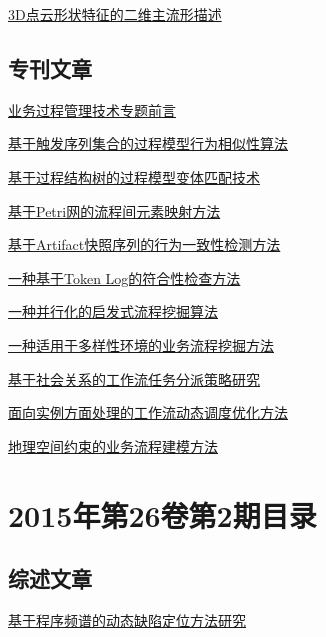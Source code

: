 \documentclass[a4paper]{article}
\begin{document}
\href{http://www.jos.org.cn/ch/reader/download_pdf.aspx?file_no=4653&year_id=2015&quarter_id=3&falg=1}{3D点云形状特征的二维主流形描述}

\subsection{专刊文章}
\href{http://www.jos.org.cn/ch/reader/download_pdf.aspx?file_no=4774&year_id=2015&quarter_id=3&falg=1}{业务过程管理技术专题前言}

\href{http://www.jos.org.cn/ch/reader/download_pdf.aspx?file_no=4765&year_id=2015&quarter_id=3&falg=1}{基于触发序列集合的过程模型行为相似性算法}

\href{http://www.jos.org.cn/ch/reader/download_pdf.aspx?file_no=4768&year_id=2015&quarter_id=3&falg=1}{基于过程结构树的过程模型变体匹配技术}

\href{http://www.jos.org.cn/ch/reader/download_pdf.aspx?file_no=4773&year_id=2015&quarter_id=3&falg=1}{基于Petri网的流程间元素映射方法}

\href{http://www.jos.org.cn/ch/reader/download_pdf.aspx?file_no=4764&year_id=2015&quarter_id=3&falg=1}{基于Artifact快照序列的行为一致性检测方法}

\href{http://www.jos.org.cn/ch/reader/download_pdf.aspx?file_no=4771&year_id=2015&quarter_id=3&falg=1}{一种基于Token Log的符合性检查方法}

\href{http://www.jos.org.cn/ch/reader/download_pdf.aspx?file_no=4769&year_id=2015&quarter_id=3&falg=1}{一种并行化的启发式流程挖掘算法}

\href{http://www.jos.org.cn/ch/reader/download_pdf.aspx?file_no=4770&year_id=2015&quarter_id=3&falg=1}{一种适用于多样性环境的业务流程挖掘方法}

\href{http://www.jos.org.cn/ch/reader/download_pdf.aspx?file_no=4766&year_id=2015&quarter_id=3&falg=1}{基于社会关系的工作流任务分派策略研究}

\href{http://www.jos.org.cn/ch/reader/download_pdf.aspx?file_no=4767&year_id=2015&quarter_id=3&falg=1}{面向实例方面处理的工作流动态调度优化方法}

\href{http://www.jos.org.cn/ch/reader/download_pdf.aspx?file_no=4772&year_id=2015&quarter_id=3&falg=1}{地理空间约束的业务流程建模方法}


\section{\textbf{2015年第26卷第2期目录}}
\subsection{综述文章}
\href{http://www.jos.org.cn/ch/reader/download_pdf.aspx?file_no=4708&year_id=2015&quarter_id=2&falg=1}{基于程序频谱的动态缺陷定位方法研究}
\end{document}
